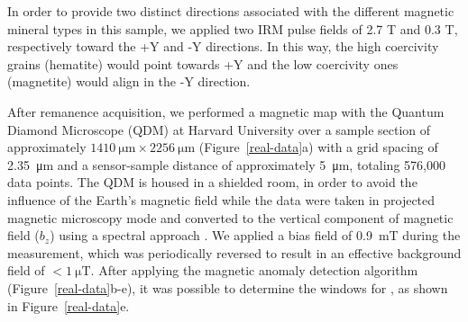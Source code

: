 In order to provide two distinct directions associated with the different
magnetic mineral types in this sample, we applied two IRM pulse fields of 2.7 T
and 0.3 T, respectively toward the +Y and -Y directions. In this way, the high
coercivity grains (hematite) would point towards +Y and the low coercivity ones
(magnetite) would align in the -Y direction.

After remanence acquisition, we performed a magnetic map with the Quantum
Diamond Microscope (QDM) at Harvard University over a sample section of
approximately $\qty{1410}{\um} \times \qty{2256}{\um}$ (Figure~\ref{real-data}a) with a grid
spacing of \qty{2.35}{\um} and a sensor-sample distance of approximately \qty{5}{\um}, totaling
576,000 data points. The QDM is housed in a shielded room, in
order to avoid the influence of the Earth's magnetic field while the data were taken in projected magnetic microscopy \DIFdelbegin {}\DIFdelend mode and converted to the vertical component of magnetic field ($b_z$) using a spectral approach \citep{Lima2009, Fu2020,
Glenn2017}. We applied a bias field of \qty{0.9}{\milli\tesla} during the measurement, which was periodically reversed to result in an effective background field of $< \qty{1}{\micro\tesla}$.  After applying the magnetic anomaly detection algorithm (Figure~\ref{real-data}b-e), it was
possible to determine the windows for \DIFdelbegin {}\DIFdelend \DIFaddbegin {}\DIFaddend , as shown in Figure~\ref{real-data}e.

